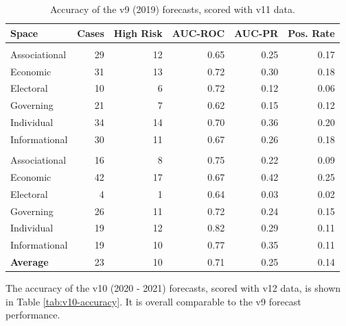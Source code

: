 \documentclass[
  11pt,
]{article}
\begin{document}
\begin{table}

\caption{\label{tab:v9-accuracy}Accuracy of the v9 (2019) forecasts, scored with v11 data.}
\centering
\begin{tabular}[t]{lrrrrr}
\toprule
Space & Cases & High Risk & AUC-ROC & AUC-PR & Pos. Rate\\
\midrule
\addlinespace[0.3em]
\multicolumn{6}{l}{\textbf{Closing}}\\
\hspace{1em}Associational & 29 & 12 & 0.65 & 0.25 & 0.17\\
\hspace{1em}Economic & 31 & 13 & 0.72 & 0.30 & 0.18\\
\hspace{1em}Electoral & 10 & 6 & 0.72 & 0.12 & 0.06\\
\hspace{1em}Governing & 21 & 7 & 0.62 & 0.15 & 0.12\\
\hspace{1em}Individual & 34 & 14 & 0.70 & 0.36 & 0.20\\
\hspace{1em}Informational & 30 & 11 & 0.67 & 0.26 & 0.18\\
\addlinespace[0.3em]
\multicolumn{6}{l}{\textbf{Opening}}\\
\hspace{1em}Associational & 16 & 8 & 0.75 & 0.22 & 0.09\\
\hspace{1em}Economic & 42 & 17 & 0.67 & 0.42 & 0.25\\
\hspace{1em}Electoral & 4 & 1 & 0.64 & 0.03 & 0.02\\
\hspace{1em}Governing & 26 & 11 & 0.72 & 0.24 & 0.15\\
\hspace{1em}Individual & 19 & 12 & 0.82 & 0.29 & 0.11\\
\hspace{1em}Informational & 19 & 10 & 0.77 & 0.35 & 0.11\\
\addlinespace[0.3em]
\textbf{Average} & 23 & 10 & 0.71 & 0.25 & 0.14\\
\bottomrule
\end{tabular}
\end{table}

The accuracy of the v10 (2020 - 2021) forecasts, scored with v12 data,
is shown in Table \ref{tab:v10-accuracy}. It is overall comparable to
the v9 forecast performance.
\end{document}
